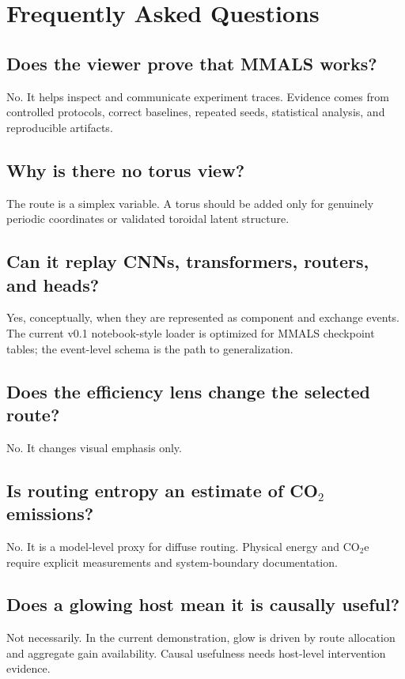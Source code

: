 \documentclass[11pt,a4paper]{article}
\begin{document}
\section{Frequently Asked Questions}

\subsection*{Does the viewer prove that MMALS works?}
No. It helps inspect and communicate experiment traces. Evidence comes from controlled protocols, correct baselines, repeated seeds, statistical analysis, and reproducible artifacts.

\subsection*{Why is there no torus view?}
The route is a simplex variable. A torus should be added only for genuinely periodic coordinates or validated toroidal latent structure.

\subsection*{Can it replay CNNs, transformers, routers, and heads?}
Yes, conceptually, when they are represented as component and exchange events. The current v0.1 notebook-style loader is optimized for MMALS checkpoint tables; the event-level schema is the path to generalization.

\subsection*{Does the efficiency lens change the selected route?}
No. It changes visual emphasis only.

\subsection*{Is routing entropy an estimate of CO$_2$ emissions?}
No. It is a model-level proxy for diffuse routing. Physical energy and CO$_2$e require explicit measurements and system-boundary documentation.

\subsection*{Does a glowing host mean it is causally useful?}
Not necessarily. In the current demonstration, glow is driven by route allocation and aggregate gain availability. Causal usefulness needs host-level intervention evidence.
\end{document}
